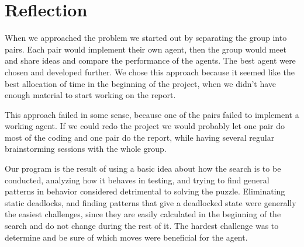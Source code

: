 \documentclass[article,11pt]{article}
\begin{document}
\section{Reflection}
When we approached the problem we started out by separating the group
into pairs. Each pair would implement their own agent, then the group
would meet and share ideas and compare the performance of the
agents. The best agent were chosen and developed further. We chose
this approach because it seemed like the best allocation of time in
the beginning of the project, when we didn’t have enough material to
start working on the report. 

This approach failed in some sense, because one of the pairs failed to
implement a working agent. If we could redo the project we would
probably let one pair do most of the coding and one pair do the
report, while having several regular brainstorming sessions with the
whole group.

Our program is the result of using a basic idea about how the search
is to be conducted, analyzing how it behaves in testing, and trying to
find general patterns in behavior considered detrimental to solving
the puzzle. Eliminating static deadlocks, and finding patterns that
give a deadlocked state were generally the easiest challenges, since
they are easily calculated in the beginning of the search and do not
change during the rest of it. The hardest challenge was to determine
and be sure of which moves were beneficial for the agent. 
\end{document}

